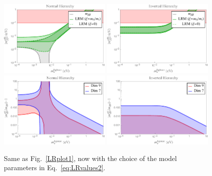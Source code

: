 \documentclass[letterpaper,11pt]{article}
\begin{document}
\begin{figure}[t]
\begin{center}
\includegraphics[width=0.49\textwidth]{mbb_NH_vL.pdf}
\includegraphics[width=0.49\textwidth]{mbb_IH_vL.pdf}
\includegraphics[width=0.49\textwidth]{Ratio_NH_vL.pdf}
\includegraphics[width=0.49\textwidth]{Ratio_IH_vL.pdf}
\vspace{-0.75cm}
\end{center}
\caption{Same as Fig.\ \ref{LRplot1}, now with the choice of the model parameters in Eq.\ \eqref{eq:LRvalues2}.
}\label{LRplot2}
\end{figure}
\end{document}
